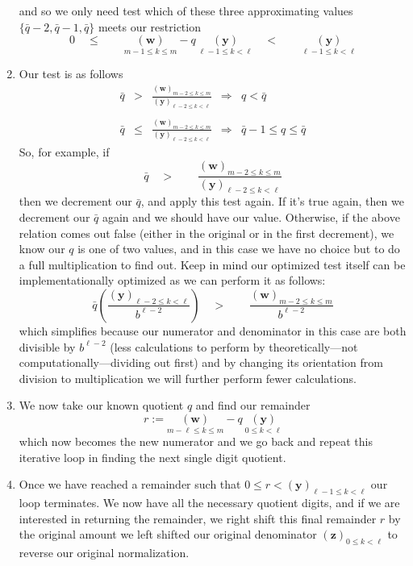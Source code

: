 \documentclass[twoside]{article}
\renewcommand{\leq}{\ensuremath{\quad\le\qquad}}
\newcommand{\bradix}[2][u]{\ensuremath{\underset{#2}{(\bm{#1})}}}
\newcommand{\numer}[3][w]{\ensuremath{(\bm{#1})_{#2\le k\le #3}}}
\newcommand{\denom}[3][y]{\ensuremath{(\bm{#1})_{#2\le k <  #3}}}
\begin{document}
\begin{enumerate}
and so we only need test which of these three approximating values $ \{\bar{q}-2, \bar{q}-1, \bar{q}\} $ meets our restriction
$$ 0\leq\bradix[w]{m-1\le k\le m}-q\ \bradix[y]{\ell-1\le k < \ell}\quad <\qquad\bradix[y]{\ell-1\le k < \ell} $$
\item Our test is as follows
$$ \boxed{
\begin{array}{lcccl}
\bar{q} & > & \frac{\numer{m-2}{m}}{\denom{\ell-2}{\ell}} & \Longrightarrow & q < \bar{q} \\
\\
\bar{q} & \le & \frac{\numer{m-2}{m}}{\denom{\ell-2}{\ell}} & \Longrightarrow & \bar{q}-1\le q\le\bar{q}
\end{array}
} $$
So, for example, if
$$ \bar{q}\quad >\qquad\frac{\numer{m-2}{m}}{\denom{\ell-2}{\ell}} $$
then we decrement our $ \bar{q} $, and apply this test again. If it's true again, then we decrement our $ \bar{q} $ again and we
should have our value. Otherwise, if the above relation comes out false (either in the original or in the first decrement),
we know our $ q $ is one of two values, and in this case we have no choice but to do a full multiplication to find out.
Keep in mind our optimized test itself can be implementationally optimized as we can perform it as follows:
$$ \bar{q}\left(\frac{\denom{\ell-2}{\ell}}{b^{\ell-2}}\right)\quad >\qquad\frac{\numer{m-2}{m}}{b^{\ell-2}} $$
which simplifies because our numerator and denominator in this case are both divisible by $ b^{\ell-2} $
(less calculations to perform by theoretically---not computationally---dividing out first) and by changing
its orientation from division to multiplication we will further perform fewer calculations.
\item We now take our known quotient $ q $ and find our remainder
$$ r:=\bradix[w]{m-\ell\le k\le m}-q\ \bradix[y]{0\le k < \ell} $$
which now becomes the new numerator and we go back and repeat this iterative loop in finding the next single digit quotient.
\item Once we have reached a remainder such that $ 0\le r < \denom{\ell-1}{\ell} $ our loop terminates.  We now have all the
necessary quotient digits, and if we are interested in returning the remainder, we right shift this final remainder $ r $ by
the original amount we left shifted our original denominator $ \denom[z]{0}{\ell} $ to reverse our original normalization.

\end{enumerate}
\end{document}
